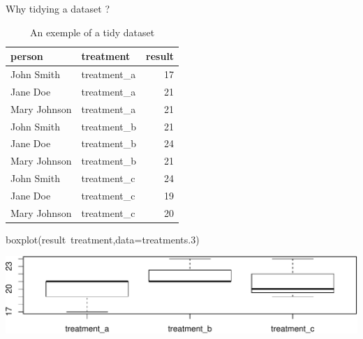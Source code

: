 \documentclass[14pt,ignorenonframetext,]{bredelebeamer}
\newenvironment{Shaded}{\begin{snugshade}}{\end{snugshade}}
\newcommand{\KeywordTok}[1]{\textcolor[rgb]{0.94,0.87,0.69}{#1}}
\newcommand{\DataTypeTok}[1]{\textcolor[rgb]{0.87,0.87,0.75}{#1}}
\newcommand{\DecValTok}[1]{\textcolor[rgb]{0.86,0.86,0.80}{#1}}
\newcommand{\OperatorTok}[1]{\textcolor[rgb]{0.94,0.94,0.82}{#1}}
\newcommand{\NormalTok}[1]{\textcolor[rgb]{0.80,0.80,0.80}{#1}}
\begin{document}
\begin{frame}[fragile]{Why tidying a dataset ?}

\begin{center}
\begin{table}[t]

\caption{\label{tab:unnamed-chunk-5}An exemple of a tidy dataset}
\centering
\begin{tabular}{l|l|r}
\hline
person & treatment & result\\
\hline
John Smith & treatment\_a & 17\\
\hline
Jane Doe & treatment\_a & 21\\
\hline
Mary Johnson & treatment\_a & 21\\
\hline
John Smith & treatment\_b & 21\\
\hline
Jane Doe & treatment\_b & 24\\
\hline
Mary Johnson & treatment\_b & 21\\
\hline
John Smith & treatment\_c & 24\\
\hline
Jane Doe & treatment\_c & 19\\
\hline
Mary Johnson & treatment\_c & 20\\
\hline
\end{tabular}
\end{table}
\end{center}

\begin{Shaded}
\begin{Highlighting}[]
\KeywordTok{boxplot}\NormalTok{(result}\OperatorTok{~}\NormalTok{treatment,}\DataTypeTok{data=}\NormalTok{treatments.}\DecValTok{3}\NormalTok{)}
\end{Highlighting}
\end{Shaded}

\includegraphics{tidyverse_28_03_files/figure-beamer/boxplot3-1.pdf}

\end{frame}
\end{document}
